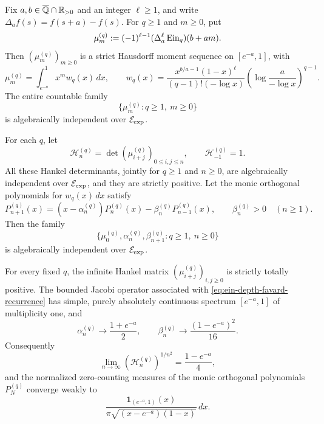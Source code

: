 \begin{corollary}
\label{cor:ein-depth-hausdorff-spectra}
Fix \(a,b\in\overline{\mathbb Q}\cap\mathbb R_{>0}\) and an integer \(\ell\geq1\), and
write \(\Delta_a f(s)=f(s+a)-f(s)\).  For \(q\geq1\) and \(m\geq0\), put
\begin{equation}\label{eq:ein-depth-finite-difference-moments}
 \mu_m^{(q)}
 :=(-1)^{\ell-1}(\Delta_a^\ell\operatorname{Ein}_{q})(b+am).
\end{equation}
Then \((\mu_m^{(q)})_{m\geq0}\) is a strict Hausdorff moment sequence on
\([e^{-a},1]\), with
\begin{equation}\label{eq:ein-depth-hausdorff-density}
 \mu_m^{(q)}=\int_{e^{-a}}^1x^m w_q(x)\,dx,
 \qquad
 w_q(x)=
 \frac{x^{b/a-1}(1-x)^\ell}{(q-1)!(-\log x)}
 \left(\log\frac{a}{-\log x}\right)^{q-1}.
\end{equation}
The entire countable family
\begin{equation}\label{eq:ein-depth-all-moments-independent}
 \{\mu_m^{(q)}:q\geq1,\ m\geq0\}
\end{equation}
is algebraically independent over \(\mathcal E_{\mathrm{exp}}\).

For each \(q\), let
\[
 \mathcal H_n^{(q)}
  =\det(\mu_{i+j}^{(q)})_{0\leq i,j\leq n},
 \qquad \mathcal H_{-1}^{(q)}=1.
\]
All these Hankel determinants, jointly for \(q\geq1\) and \(n\geq0\),
are algebraically independent over \(\mathcal E_{\mathrm{exp}}\), and they are strictly
positive.  Let the monic orthogonal polynomials for \(w_q(x)\,dx\) satisfy
\begin{equation}\label{eq:ein-depth-favard-recurrence}
 P_{n+1}^{(q)}(x)
 =(x-\alpha_n^{(q)})P_n^{(q)}(x)
  -\beta_n^{(q)}P_{n-1}^{(q)}(x),
 \qquad \beta_n^{(q)}>0\quad(n\geq1).
\end{equation}
Then the family
\begin{equation}\label{eq:ein-depth-favard-independent}
 \{\mu_0^{(q)},\alpha_n^{(q)},\beta_{n+1}^{(q)}:
        q\geq1,\ n\geq0\}
\end{equation}
is algebraically independent over \(\mathcal E_{\mathrm{exp}}\).

For every fixed \(q\), the infinite Hankel matrix
\((\mu_{i+j}^{(q)})_{i,j\geq0}\) is strictly totally positive.  The
bounded Jacobi operator associated with
\eqref{eq:ein-depth-favard-recurrence} has simple, purely absolutely
continuous spectrum \([e^{-a},1]\) of multiplicity one, and
\begin{equation}\label{eq:ein-depth-nevai-limits}
 \alpha_n^{(q)}\longrightarrow\frac{1+e^{-a}}2,
 \qquad
 \beta_n^{(q)}\longrightarrow\frac{(1-e^{-a})^2}{16}.
\end{equation}
Consequently
\begin{equation}\label{eq:ein-depth-hankel-capacity}
 \lim_{n\to\infty}(\mathcal H_n^{(q)})^{1/n^2}
 =\frac{1-e^{-a}}4,
\end{equation}
and the normalized zero-counting measures of the monic orthogonal
polynomials \(P_N^{(q)}\) converge weakly to
\begin{equation}\label{eq:ein-depth-arcsine-law}
 \frac{\mathbf 1_{(e^{-a},1)}(x)}
 {\pi\sqrt{(x-e^{-a})(1-x)}}\,dx.
\end{equation}


\end{corollary}
